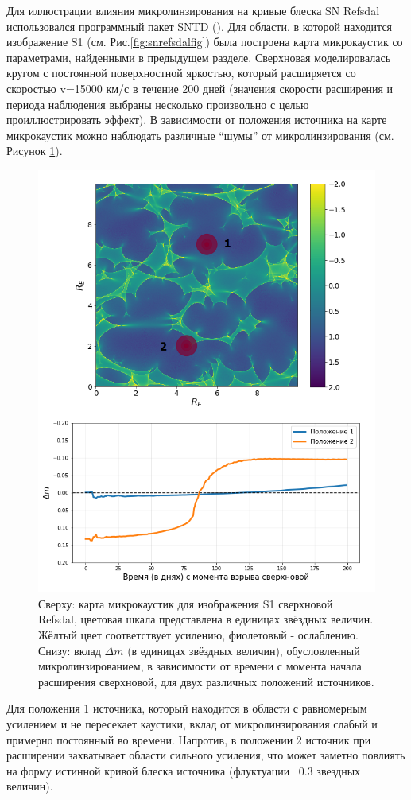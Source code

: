 Для иллюстрации влияния микролинзирования на кривые блеска SN Refsdal использовался программный пакет SNTD (\cite{pierelrodney2019}). Для области, в которой находится изображение S1 (см. Рис.\ref{fig:snrefsdalfig}) была построена карта микрокаустик со параметрами, найденными в предыдущем разделе. Сверхновая моделировалась кругом с постоянной поверхностной яркостью, который расширяется со скоростью v=15000 км/с в течение 200 дней (значения скорости расширения и периода наблюдения выбраны несколько произвольно с целью проиллюстрировать эффект). В зависимости от положения источника на карте микрокаустик можно наблюдать различные “шумы” от микролинзирования (см. Рисунок \ref{fig:sntd_example}).

\begin{figure}[H]
    \centering
	\includegraphics[scale=0.75]{pics/sntd_example.png}
	\caption{Сверху: карта микрокаустик для изображения S1 сверхновой Refsdal, цветовая шкала представлена в единицах звёздных величин. Жёлтый цвет соответствует усилению, фиолетовый - ослаблению. Снизу: вклад $\Delta m$ (в единицах звёздных величин), обусловленный микролинзированием, в зависимости от времени с момента начала расширения сверхновой, для двух различных положений источников. \label{fig:sntd_example}} 
\end{figure}

Для положения 1 источника, который находится в области с равномерным усилением и не пересекает каустики, вклад от микролинзирования слабый и примерно постоянный во времени. Напротив, в положении 2 источник при расширении захватывает области сильного усиления, что может заметно повлиять на форму истинной кривой блеска источника (флуктуации ~0.3 звездных величин). 